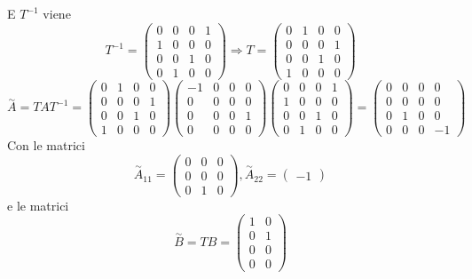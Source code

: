 \documentclass{article}
\begin{document}
E $T^{-1}$ viene \[ T^{-1} = \left(\begin{matrix}0 & 0 & 0 & 1\\1 & 0 & 0 & 0\\0 & 0 & 1 & 0\\0 & 1 & 0 & 0\end{matrix}\right) \Longrightarrow T = \left(\begin{matrix}0 & 1 & 0 & 0\\0 & 0 & 0 & 1\\0 & 0 & 1 & 0\\1 & 0 & 0 & 0\end{matrix}\right) \]
\[ \overset{\sim}{A} = T A  T^{-1} = \left(\begin{matrix}0 & 1 & 0 & 0\\0 & 0 & 0 & 1\\0 & 0 & 1 & 0\\1 & 0 & 0 & 0\end{matrix}\right)\left(\begin{matrix}-1 & 0 & 0 & 0\\0 & 0 & 0 & 0\\0 & 0 & 0 & 1\\0 & 0 & 0 & 0\end{matrix}\right)\left(\begin{matrix}0 & 0 & 0 & 1\\1 & 0 & 0 & 0\\0 & 0 & 1 & 0\\0 & 1 & 0 & 0\end{matrix}\right) = \left(\begin{matrix}0 & 0 & 0 & 0\\0 & 0 & 0 & 0\\0 & 1 & 0 & 0\\0 & 0 & 0 & -1\end{matrix}\right) \]Con le matrici \[ \overset{\sim}{A}_{11} = \left(\begin{matrix}0 & 0 & 0\\0 & 0 & 0\\0 & 1 & 0\end{matrix}\right) , \overset{\sim}{A}_{22} = \left(\begin{matrix}-1\end{matrix}\right)  \]e le matrici \[ \overset{\sim}{B} = TB = \left(\begin{matrix}1 & 0\\0 & 1\\0 & 0\\0 & 0\end{matrix}\right)  \]
\end{document}
